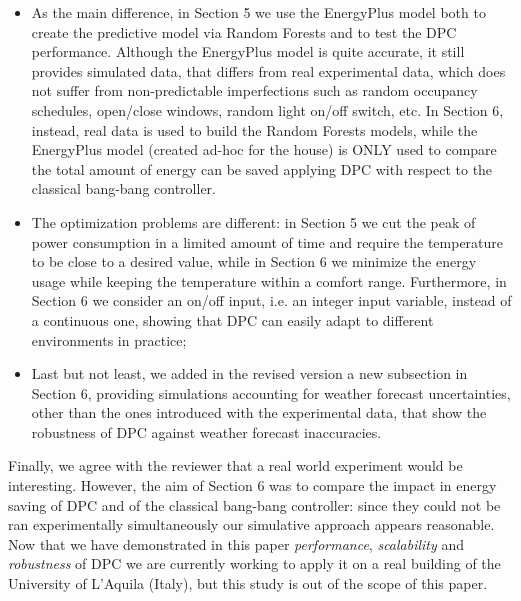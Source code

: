 \documentclass{article}
\begin{document}
\begin{enumerate}
\begin{itemize}
	\item As the main difference, in Section 5 we use the EnergyPlus model both to create the predictive model via Random Forests and to test the DPC performance. Although the EnergyPlus model is quite accurate, it still provides simulated data, that differs from real experimental data, which does not suffer from non-predictable imperfections such as random occupancy schedules, open/close windows, random light on/off switch, etc. In Section 6, instead, real data is used to build the Random Forests models, while the EnergyPlus model (created ad-hoc for the house) is ONLY used to compare the total amount of energy can be saved applying DPC with respect to the classical bang-bang controller.

	\item The optimization problems are different: in Section 5 we cut the peak of power consumption in a limited amount of time and require the temperature to be close to a desired value, while in Section 6 we minimize the energy usage while keeping the temperature within a comfort range. Furthermore, in Section 6 we consider an on/off input, i.e. an integer input variable, instead of a continuous one, showing that  DPC can easily adapt to different environments in practice;
	\item Last but not least, we added in the revised version a new subsection in Section 6, providing simulations accounting for weather forecast uncertainties, other than the ones introduced with the experimental data, that show the robustness of DPC against weather forecast inaccuracies.

\end{itemize}
Finally, we agree with the reviewer that a real world experiment would be interesting. However, the aim of Section 6 was to compare the impact in energy saving of DPC and of the classical bang-bang controller: since they could not be ran experimentally simultaneously our simulative approach appears reasonable. Now that we have demonstrated in this paper \textit{performance}, \textit{scalability} and \textit{robustness} of DPC we are currently working to apply it on a real building of the University of L'Aquila (Italy), but this study is out of the scope of this paper.

\end{enumerate}
\end{document}
